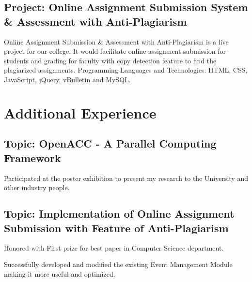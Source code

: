 \documentclass{Mihir_Kavatkar-Resume}
\begin{document}
		\vspace*{-0.5em}
		\subsection{Project: Online Assignment Submission System \& Assessment with Anti-Plagiarism}
		\vspace*{-0.5em}
		\workitems
		{Online Assignment Submission \& Assessment with Anti-Plagiarism is a live project for our college. It would facilitate online assignment submission for students and grading for faculty with copy detection feature to find the plagiarized assignments.}
		{Programming Languages and Technologies: HTML, CSS, JavaScript, jQuery, vBulletin and MySQL.}
		
	\section{Additional Experience}
		\vspace*{-0.5em}
		\vspace*{-0.5em}
		\subsection{Topic: OpenACC - A Parallel Computing Framework}
		\workitemsAdditional
		{Participated at the poster exhibition to present my research to the University and other industry people.}
		
		\vspace*{-0.5em}
		\vspace*{-0.5em}
		\subsection{Topic: Implementation of Online Assignment Submission with Feature of Anti-Plagiarism}
		\workitemsAdditional
		{Honored with First prize for best paper in Computer Science department.}
		
		\vspace*{-0.5em}
		\workitemsAdditional
		{Successfully  developed  and  modified  the  existing  Event  Management  Module  making  it  more  useful  and optimized.}
		
\end{document}
